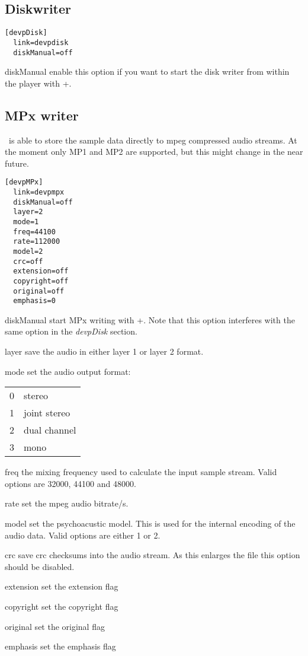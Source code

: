 \subsection{Diskwriter}
\begin{verbatim}
[devpDisk]
  link=devpdisk
  diskManual=off
\end{verbatim}
\begin{dojlist}
\item[diskManual] enable this option if you want to start the disk writer
from within the player with +.
\end{dojlist}

\subsection{MPx writer}
\cp\ is able to store the sample data directly to mpeg compressed audio
streams. At the moment only MP1 and MP2 are supported, but this might
change in the near future.
\begin{verbatim}
[devpMPx]
  link=devpmpx
  diskManual=off 
  layer=2        
  mode=1        
  freq=44100     
  rate=112000    
  model=2        
  crc=off
  extension=off
  copyright=off
  original=off
  emphasis=0
\end{verbatim}
\begin{dojlist}
\item[diskManual] start MPx writing with +. Note that this
option interferes with the same option in the \emph{devpDisk} section.
\item[layer] save the audio in either layer 1 or layer 2 format.
\item[mode] set the audio output format: \\
  \begin{tabular}{l@{ -- }l}
  0 & stereo \\
  1 & joint stereo \\
  2 & dual channel \\
  3 & mono \\
  \end{tabular}
\item[freq] the mixing frequency used to calculate the input sample stream.
Valid options are 32000, 44100 and 48000.
\item[rate] set the mpeg audio bitrate/s.
\item[model] set the psychoacustic model. This is used for the internal
encoding of the audio data. Valid options are either 1 or 2.
\item[crc] save crc checksums into the audio stream. As this enlarges the file
this option should be disabled.
\item[extension] set the extension flag
\item[copyright] set the copyright flag
\item[original] set the original flag
\item[emphasis] set the emphasis flag
\end{dojlist}

